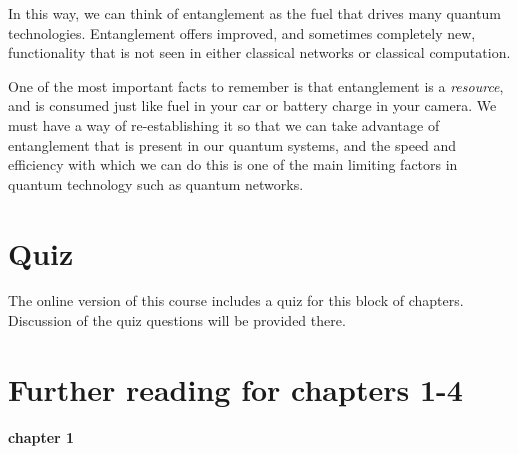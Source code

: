 In this way, we can think of entanglement as the fuel that drives many quantum technologies. Entanglement offers improved, and sometimes completely new, functionality that is not seen in either classical networks or classical computation.

One of the most important facts to remember is that entanglement is a \emph{resource}, and is consumed just like fuel in your car or battery charge in your camera. We must have a way of re-establishing it so that we can take advantage of entanglement that is present in our quantum systems, and the speed and efficiency with which we can do this is one of the main limiting factors in quantum technology such as quantum networks.


\newpage
\begin{exercises}


\end{exercises}


\newpage
\section*{Quiz}


The online version of this course includes a quiz for this block of chapters. Discussion of the quiz questions will be provided there.

\section*{Further reading for chapters 1-4}

{\bf chapter 1}\\

